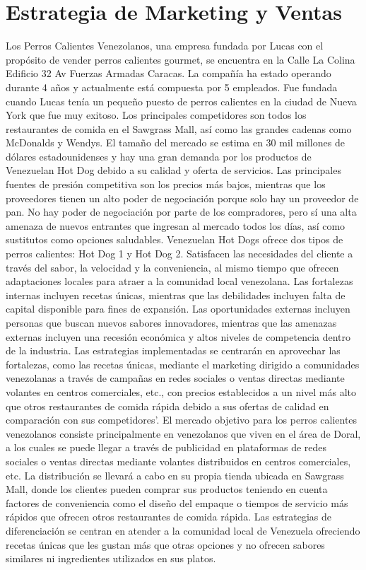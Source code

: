 \section{Estrategia de Marketing y Ventas} \label{sec:estrategiademarketingyventas}
Los Perros Calientes Venezolanos, una empresa fundada por Lucas con el propósito de vender perros calientes gourmet, se encuentra en la Calle La Colina Edificio 32 Av Fuerzas Armadas Caracas. La compañía ha estado operando durante 4 años y actualmente está compuesta por 5 empleados. Fue fundada cuando Lucas tenía un pequeño puesto de perros calientes en la ciudad de Nueva York que fue muy exitoso.
Los principales competidores son todos los restaurantes de comida en el Sawgrass Mall, así como las grandes cadenas como McDonalds y Wendys. El tamaño del mercado se estima en 30 mil millones de dólares estadounidenses y hay una gran demanda por los productos de Venezuelan Hot Dog debido a su calidad y oferta de servicios. Las principales fuentes de presión competitiva son los precios más bajos, mientras que los proveedores tienen un alto poder de negociación porque solo hay un proveedor de pan. No hay poder de negociación por parte de los compradores, pero sí una alta amenaza de nuevos entrantes que ingresan al mercado todos los días, así como sustitutos como opciones saludables.
Venezuelan Hot Dogs ofrece dos tipos de perros calientes: Hot Dog 1 y Hot Dog 2. Satisfacen las necesidades del cliente a través del sabor, la velocidad y la conveniencia, al mismo tiempo que ofrecen adaptaciones locales para atraer a la comunidad local venezolana. Las fortalezas internas incluyen recetas únicas, mientras que las debilidades incluyen falta de capital disponible para fines de expansión. Las oportunidades externas incluyen personas que buscan nuevos sabores innovadores, mientras que las amenazas externas incluyen una recesión económica y altos niveles de competencia dentro de la industria. Las estrategias implementadas se centrarán en aprovechar las fortalezas, como las recetas únicas, mediante el marketing dirigido a comunidades venezolanas a través de campañas en redes sociales o ventas directas mediante volantes en centros comerciales, etc., con precios establecidos a un nivel más alto que otros restaurantes de comida rápida debido a sus ofertas de calidad en comparación con sus competidores'.
El mercado objetivo para los perros calientes venezolanos consiste principalmente en venezolanos que viven en el área de Doral, a los cuales se puede llegar a través de publicidad en plataformas de redes sociales o ventas directas mediante volantes distribuidos en centros comerciales, etc. La distribución se llevará a cabo en su propia tienda ubicada en Sawgrass Mall, donde los clientes pueden comprar sus productos teniendo en cuenta factores de conveniencia como el diseño del empaque o tiempos de servicio más rápidos que ofrecen otros restaurantes de comida rápida. Las estrategias de diferenciación se centran en atender a la comunidad local de Venezuela ofreciendo recetas únicas que les gustan más que otras opciones y no ofrecen sabores similares ni ingredientes utilizados en sus platos.
